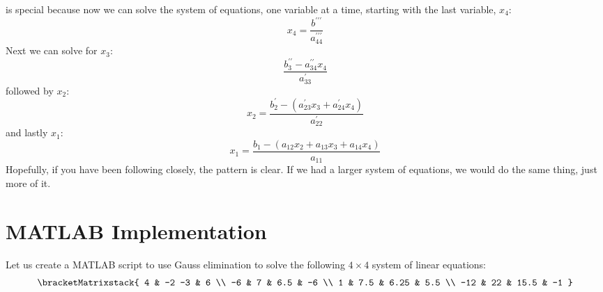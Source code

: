  is special because now we can solve the system of equations, one variable at a time, starting with the last variable, $x_4$:  
\begin{equation*}
x_{4} = \frac{b^{\prime \prime \prime}}{a^{\prime \prime \prime}_{44}}
\end{equation*}
Next we can solve for $x_3$:
\begin{equation*}
\frac{b^{\prime \prime}_3 - a^{\prime \prime}_{34}x_4}{a^{\prime}_{33}}
\end{equation*}
followed by $x_2$:
\begin{equation*}
x_{2} = \frac{b^{\prime}_2 - (a^{\prime}_{23}x_3 + a^{\prime}_{24}x_4) }{a^{\prime}_{22}}
\end{equation*}
and lastly $x_1$:
\begin{equation*}
x_1 = \frac{b_1 - (a_{12}x_2 + a_{13}x_3 + a_{14}x_4)}{a_{11}}
\end{equation*}
Hopefully, if you have been following closely, the pattern is clear. If we had a larger system of equations, we would do the same thing, just more of it.

\section{MATLAB Implementation}

Let us create a MATLAB script to use Gauss elimination to solve the following $4 \times 4$ system of linear equations:
\begin{equation*}
\bracketMatrixstack{
4 & -2 -3 & 6 \\
-6 & 7 & 6.5 & -6 \\
1 & 7.5 & 6.25 & 5.5 \\
-12 & 22 & 15.5 & -1 
}
\end{equation*}


